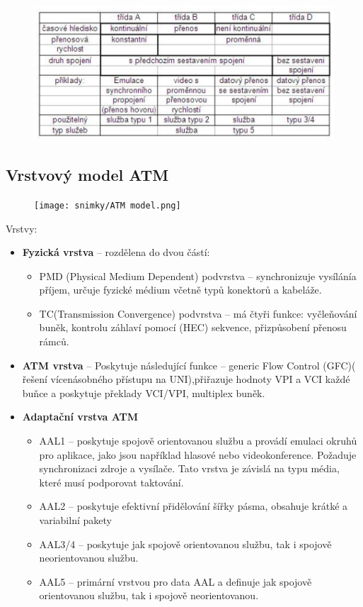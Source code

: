 \begin{figure}[h]
    \centering
    \includegraphics[scale=0.6]{snimky/sluzby.png}
\end{figure}
\newpage

\subsection{Vrstvový model ATM}
\begin{figure} [h]
    \centering
    \texttt{[image: snimky/ATM model.png]}
    \label{fig:vrstvovy-model-atm}
\end{figure}
Vrstvy:
\begin{itemize}
    \item \textbf{Fyzická vrstva} -- rozdělena do dvou částí:
          \begin{itemize}
              \item PMD (Physical Medium Dependent) podvrstva -- synchronizuje vysílánía příjem, určuje fyzické médium včetně typů konektorů a kabeláže.
              \item TC(Transmission Convergence) podvrstva -- má čtyři funkce: vyčleňování buněk, kontrolu záhlaví pomocí (HEC) sekvence, přizpůsobení přenosu rámců.
          \end{itemize}
    \item \textbf{ATM vrstva} -- Poskytuje následující funkce -- generic Flow Control (GFC)( řešení vícenásobného přístupu na UNI),přiřazuje hodnoty VPI a VCI každé buňce a poskytuje překlady VCI/VPI, multiplex buněk.
    \item \textbf{Adaptační vrstva ATM}
          \begin{itemize}
              \item AAL1 -- poskytuje spojově orientovanou službu a provádí emulaci okruhů pro aplikace, jako jsou například hlasové nebo videokonference. Požaduje synchronizaci zdroje a vysílače. Tato vrstva je závislá na typu média, které musí podporovat taktování.
              \item AAL2 -- poskytuje efektivní přidělování šířky pásma, obsahuje krátké a variabilní pakety
              \item AAL3/4 -- poskytuje jak spojově orientovanou službu, tak i spojově neorientovanou službu.
              \item AAL5 -- primární vrstvou pro data AAL a definuje jak spojově orientovanou službu, tak i spojově neorientovanou.
          \end{itemize}
\end{itemize}

